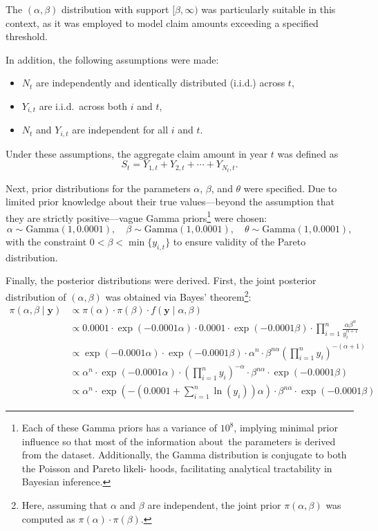 \documentclass{Class/julia}
\begin{document}
\noindent The \((\alpha, \beta)\) distribution with support \( [\beta, \infty) \) was particularly suitable in this context, as it was employed to model claim amounts exceeding a specified threshold.

In addition, the following assumptions were made:

\begin{itemize}
\item \( N_t \) are independently and identically distributed (i.i.d.) across \( t \),
\item \( Y_{i,t} \) are i.i.d.\ across both \( i \) and \( t \),
\item \( N_t \) and \( Y_{i,t} \) are independent for all \( i \) and \( t \).
\end{itemize}

\noindent Under these assumptions, the aggregate claim amount in year \( t \) was defined as
\[
S_t = Y_{1,t} + Y_{2,t} + \cdots + Y_{N_t,t}.
\]

Next, prior distributions for the parameters \( \alpha \), \( \beta \), and \( \theta \) were specified. Due to limited prior knowledge about their true values—beyond the assumption that they are strictly positive—vague Gamma priors\footnote{Each of these Gamma priors has a variance of \(10^8\), implying minimal prior influence so that most of the information about~the parameters is derived from the dataset. Additionally, the Gamma distribution is conjugate to both the Poisson and Pareto likeli- hoods, facilitating analytical tractability in Bayesian inference.} were chosen:
\[
\alpha \sim \text{Gamma}(1, 0.0001), \quad \beta \sim \text{Gamma}(1, 0.0001), \quad \theta \sim \text{Gamma}(1, 0.0001),
\]
with the constraint \( 0 < \beta < \min\{y_{i,t}\} \) to ensure validity of the Pareto distribution.

Finally, the posterior distributions were derived. First, the joint posterior distribution of \( (\alpha, \beta) \) was obtained via Bayes' theorem\footnote{Here, assuming that \( \alpha \) and \( \beta \) are independent, the joint prior \( \pi(\alpha, \beta) \) was computed as \( \pi(\alpha) \cdot \pi(\beta) \).}:
\begin{align*}
\pi(\alpha, \beta \mid \mathbf{y}) &\propto \pi(\alpha) \cdot \pi(\beta) \cdot f(\mathbf{y} \mid \alpha, \beta) \\
&\propto 0.0001 \cdot \exp(-0.0001 \alpha) \cdot 0.0001 \cdot \exp(-0.0001 \beta) \cdot \prod_{i=1}^{n} \frac{\alpha \beta^\alpha}{y_i^{\alpha+1}} \\
&\propto \exp(-0.0001 \alpha) \cdot \exp(-0.0001 \beta) \cdot \alpha^n \cdot \beta^{n \alpha} \left( \prod_{i=1}^{n} y_i \right)^{-(\alpha + 1)} \\
&\propto \alpha^n \cdot \exp(-0.0001 \alpha) \cdot \left( \prod_{i=1}^{n} y_i \right)^{-\alpha} \cdot \beta^{n \alpha} \cdot \exp(-0.0001 \beta) \\
&\propto \alpha^n \cdot \exp\left( - \left( 0.0001 + \sum_{i=1}^{n} \ln(y_i) \right) \alpha \right) \cdot \beta^{n \alpha} \cdot \exp(-0.0001 \beta)
\end{align*}
\end{document}
